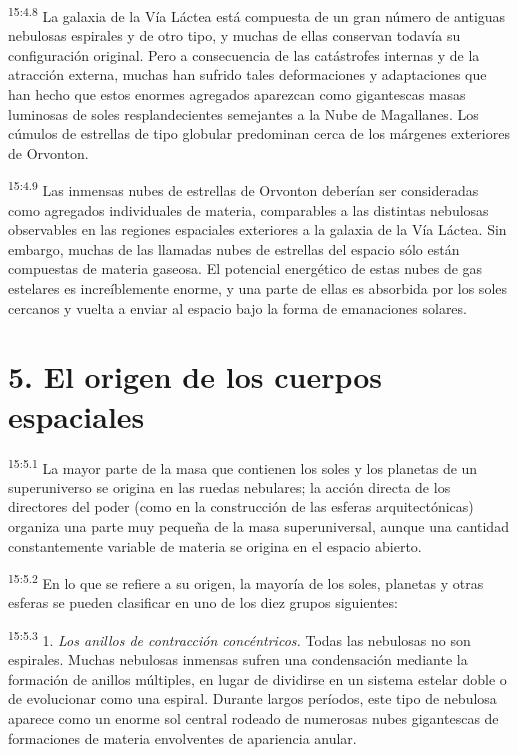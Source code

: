\par
\textsuperscript{15:4.8} La galaxia de la Vía Láctea está compuesta de un gran número de antiguas nebulosas espirales y de otro tipo, y muchas de ellas conservan todavía su configuración original. Pero a consecuencia de las catástrofes internas y de la atracción externa, muchas han sufrido tales deformaciones y adaptaciones que han hecho que estos enormes agregados aparezcan como gigantescas masas luminosas de soles resplandecientes semejantes a la Nube de Magallanes. Los cúmulos de estrellas de tipo globular predominan cerca de los márgenes exteriores de Orvonton.

\par
\textsuperscript{15:4.9} Las inmensas nubes de estrellas de Orvonton deberían ser consideradas como agregados individuales de materia, comparables a las distintas nebulosas observables en las regiones espaciales exteriores a la galaxia de la Vía Láctea. Sin embargo, muchas de las llamadas nubes de estrellas del espacio sólo están compuestas de materia gaseosa. El potencial energético de estas nubes de gas estelares es increíblemente enorme, y una parte de ellas es absorbida por los soles cercanos y vuelta a enviar al espacio bajo la forma de emanaciones solares.

\section*{5. El origen de los cuerpos espaciales}
\par
\textsuperscript{15:5.1} La mayor parte de la masa que contienen los soles y los planetas de un superuniverso se origina en las ruedas nebulares; la acción directa de los directores del poder (como en la construcción de las esferas arquitectónicas) organiza una parte muy pequeña de la masa superuniversal, aunque una cantidad constantemente variable de materia se origina en el espacio abierto.

\par
\textsuperscript{15:5.2} En lo que se refiere a su origen, la mayoría de los soles, planetas y otras esferas se pueden clasificar en uno de los diez grupos siguientes:

\par
\textsuperscript{15:5.3} 1. \textit{Los anillos de contracción concéntricos.} Todas las nebulosas no son espirales. Muchas nebulosas inmensas sufren una condensación mediante la formación de anillos múltiples, en lugar de dividirse en un sistema estelar doble o de evolucionar como una espiral. Durante largos períodos, este tipo de nebulosa aparece como un enorme sol central rodeado de numerosas nubes gigantescas de formaciones de materia envolventes de apariencia anular.

